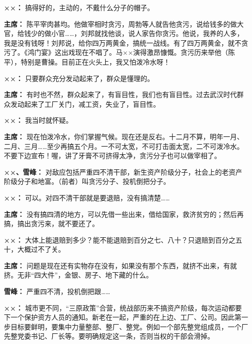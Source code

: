 \begin{duihua}
\item[\textbf{××：}] 搞得好的，主动的，不戴什么分子的帽子。

\item[\textbf{主席：}] 陈平宰肉甚均。他做宰相时贪污，周勃等人就告他贪污，说给钱多的做大官，给钱少的做小官……，刘邦就找他谈，说人家告你贪污。他说，我养的人多，我是没有钱呀！刘邦说，给你四万两黄金，搞统一战线。有了四万两黄金，就不贪污了。《鸿门宴》这出戏现在不唱了。马××演得激昂慷慨。贪污历来举他（陈平），特别是曹操。目前正在火头上，我又怕泼冷水呀！

\item[\textbf{××：}] 只要群众充分发动起来了，群众是懂理的。

\item[\textbf{主席：}] 有时也不然，群众起来了，有盲目性，我们也有盲目性。过去武汉时代群众发动起来了工厂关门，减工资，失业了，盲目性。

\item[\textbf{××：}] 我当时就怀疑。

\item[\textbf{主席：}] 现在怕泼冷水，你们掌握气候。现在还是反右。十二月不算，明年一月、二月、三月……至少再搞五个月。一不可太宽，不可打击面太宽，二不可泼冷水。不要下边宣布！喔，讲了牙膏不可挤得太净，贪污分子也可以做宰相了。

\item[\textbf{××、雪峰：}] 对敌应包括严重四不清干部，新生资产阶级分子，社会上的老资产阶级分子和地富。（前者）叫贪污分子、投机倒把分子。

\item[\textbf{××：}] 可以。对四不清干部就是要退赔，没有搞清楚……

\item[\textbf{主席：}] 没有搞四清的地方，可以先借一些出来，借给国家，救济贫穷的；然后再搞，搞出贪污来，就不要还了。

\item[\textbf{××：}] 大体上能退赔到多少？能不能退赔到百分之七、八十？只退赔到百分之五十，大概过不了关。

\item[\textbf{主席：}] 问题是现在还有实物存在没有，如果没有那个东西，就挤不出来，有就挤。无非“四大件”，金银、房子、地下藏的什么。

\item[\textbf{雪峰：}] 严重四不清，投机倒把跟……

\item[\textbf{××：}] 城市更不同，“三原政策”合营，统战部历来不搞资产阶级，每次运动都要下一个保护资方人员的通知。新老在一起，严重的在上边、工厂、公司。因此第一步目标要鲜明，要集中力量整部、整厂、整党。例如一个部先整党组成员，一个厂先整党委书记、厂长等。要明确规定这一条，否则当权的干部会滑掉。


\end{duihua}
